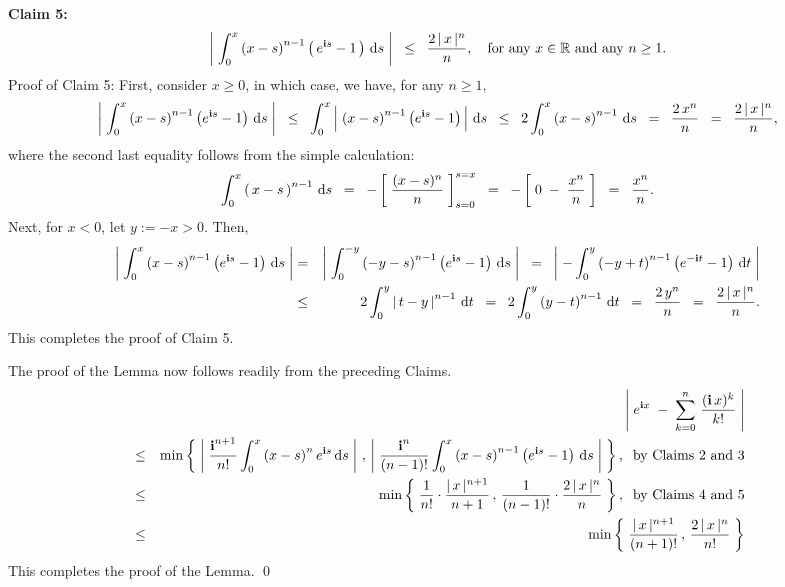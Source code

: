 \vskip 0.5cm

\begin{center}
\begin{minipage}{6.5in}
\noindent
\textbf{Claim 5:}
\begin{equation*}
\left\vert\;
\int_{0}^{x}\left(x-s\right)^{n-1}\left(\,e^{\textnormal{\bf i} s} - 1\,\right)\,\textnormal{d} s
\;\right\vert
\;\; \leq \;\; \dfrac{2\,\vert\,x\,\vert^{n}}{n},
\quad
\textnormal{for any $x \in \mathbb{R}$ and any $n \geq 1$.}
\end{equation*}
Proof of Claim 5: First, consider $x \geq 0$, in which case, we have, for any $n \geq 1$,
\begin{equation*}
\left\vert\;
\int_{0}^{x}\left(x-s\right)^{n-1}\left(e^{\textnormal{\bf i} s} - 1\right)\,\textnormal{d} s
\;\right\vert
\;\;\leq\;\;
\int_{0}^{x}
\left\vert\;
\left(x-s\right)^{n-1}\left(e^{\textnormal{\bf i} s} - 1\right)
\,\right\vert
\,\textnormal{d} s
\;\;\leq\;\; 2 \int_{0}^{x}\left(x-s\right)^{n-1}\,\textnormal{d} s
\;\;=\;\; \dfrac{2\,x^{n}}{n}
\;\;=\;\; \dfrac{2\,\vert\,x\,\vert^{n}}{n},
\end{equation*}
where the second last equality follows from the simple calculation:
\begin{equation*}
\int_{0}^{x}\left(\,x-s\,\right)^{n-1}\,\textnormal{d} s
\;\;=\;\; - \left[\;\dfrac{(x-s)^{n}}{n}\;\right]_{s=0}^{s=x}
\;\;=\;\; - \left[\;0 \; - \; \dfrac{x^{n}}{n}\;\right]
\;\;=\;\; \dfrac{x^{n}}{n}.
\end{equation*}
Next, for $x < 0$, let $y:=-x > 0$. Then,
\begin{eqnarray*}
\left\vert\;
\int_{0}^{x}\left(x-s\right)^{n-1}\left(e^{\textnormal{\bf i} s} - 1\right)\,\textnormal{d} s
\;\right\vert
&=&
\left\vert\;
\int_{0}^{-y}\left(-y-s\right)^{n-1}\left(e^{\textnormal{\bf i} s} - 1\right)\,\textnormal{d} s
\;\right\vert
\;\;=\;\;
\left\vert\;
-\int_{0}^{y}\left(-y+t\right)^{n-1}\left(e^{-\textnormal{\bf i} t} - 1\right)\,\textnormal{d} t
\;\right\vert
\\
&\leq& 2\int_{0}^{y}\left\vert\,t-y\,\right\vert^{n-1}\,\textnormal{d} t
\;\;=\;\; 2 \int_{0}^{y}\left(y-t\right)^{n-1}\,\textnormal{d} t
\;\;=\;\; \dfrac{2\,y^{n}}{n}
\;\;=\;\; \dfrac{2\,\vert\,x\,\vert^{n}}{n}.
\end{eqnarray*}
This completes the proof of Claim 5.
\end{minipage}
\end{center}
The proof of the Lemma now follows readily from the preceding Claims.
\begin{eqnarray*}
&& \left\vert\;e^{\textnormal{\bf i} x} \;-\; \sum_{k = 0}^{n}\,\dfrac{(\textnormal{\bf i}\,x)^{k}}{k!} \;\right\vert
\\
&\leq&
\min\left\{\;
\left\vert\;\dfrac{\textnormal{\bf i}^{n+1}}{n!}\int_{0}^{x}\left(x-s\right)^{n}e^{\textnormal{\bf i} s}\,\textnormal{d} s\;\right\vert
\,,\,
\left\vert\;\dfrac{\textnormal{\bf i}^{n}}{(n-1)!}\int_{0}^{x}\left(x-s\right)^{n-1}\left(e^{\textnormal{\bf i} s}-1\right)\,\textnormal{d} s\;\right\vert
\;\right\},
\;\;\textnormal{by Claims 2 and 3}
\\
&\leq&
\min\left\{\;
\dfrac{1}{n!}\cdot\dfrac{\vert\,x\,\vert^{n+1}}{n+1}
\,,\,
\dfrac{1}{(n-1)!}\cdot\dfrac{2\,\vert\,x\,\vert^{n}}{n}
\;\right\},
\;\;\textnormal{by Claims 4 and 5}
\\
&\leq&
\min\left\{\;
\dfrac{\vert\,x\,\vert^{n+1}}{(n+1)!}
\,,\,
\dfrac{2\,\vert\,x\,\vert^{n}}{n!}
\;\right\}
\end{eqnarray*}
This completes the proof of the Lemma.
\qed

